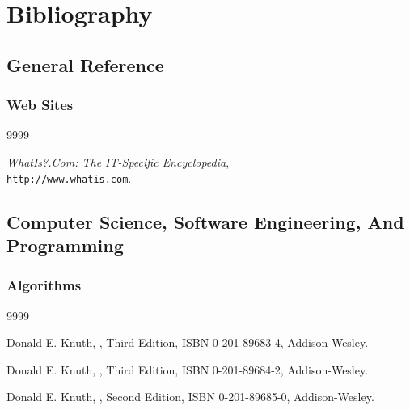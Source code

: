 %
\chapter*{Bibliography}



\nocite{*}


\section*{General Reference}

\subsection*{Web Sites}

\begin{thecustombibliography}{9999}

\emph{WhatIs?.Com:  The IT-Specific Encyclopedia}, \\
\texttt{http://www.whatis.com}.

\end{thecustombibliography}


\section*{Computer Science, Software Engineering, And Programming}

\subsection*{Algorithms}

\begin{thecustombibliography}{9999}

Donald E. Knuth,
,
Third Edition, ISBN 0-201-89683-4, Addison-Wesley.

Donald E. Knuth,
,
Third Edition, 
ISBN 0-201-89684-2, Addison-Wesley.

Donald E. Knuth,
,
Second Edition,
ISBN 0-201-89685-0, Addison-Wesley.

\end{thecustombibliography}

